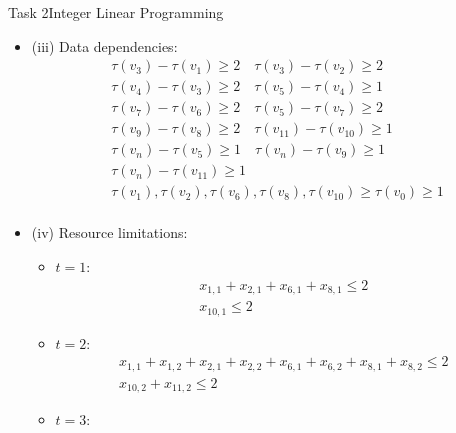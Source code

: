 \begin{frame}[allowframebreaks]{Task 2}{Integer Linear Programming}
\begin{solutionnoinc}
    \begin{itemize}
      \item \alert{(iii) Data dependencies:}
        \[
        \begin{aligned}
        & \tau\left(v_3\right)-\tau\left(v_1\right) \geq 2 \quad \tau\left(v_3\right)-\tau\left(v_2\right) \geq 2 \\
        & \tau\left(v_4\right)-\tau\left(v_3\right) \geq 2 \quad \tau\left(v_5\right)-\tau\left(v_4\right) \geq 1 \\
        & \tau\left(v_7\right)-\tau\left(v_6\right) \geq 2 \quad \tau\left(v_5\right)-\tau\left(v_7\right) \geq 2 \\
        & \tau\left(v_9\right)-\tau\left(v_8\right) \geq 2 \quad \tau\left(v_{11}\right)-\tau\left(v_{10}\right) \geq 1 \\
        & \tau\left(v_n\right)-\tau\left(v_5\right) \geq 1 \quad \tau\left(v_n\right)-\tau\left(v_9\right) \geq 1 \\
        & \tau\left(v_n\right)-\tau\left(v_{11}\right) \geq 1 \\
        & \tau\left(v_1\right), \tau\left(v_2\right), \tau\left(v_6\right), \tau\left(v_8\right), \tau\left(v_{10}\right) \geq \tau\left(v_0\right) \geq 1 \\
        &
        \end{aligned}
        \]
    \end{itemize}
  \end{solutionnoinc}
  \begin{solutionnoinc}
    \begin{itemize}
      \item \alert{(iv) Resource limitations:}
      \begin{itemize}
         \item $t=1$:
        \[ \begin{gathered}
          x_{1,1}+x_{2,1}+x_{6,1}+x_{8,1} \leq 2 \\
          x_{10,1} \leq 2
          \end{gathered}
        \]
      \item $t=2$:
        \[
          \begin{gathered}
          x_{1,1}+x_{1,2}+x_{2,1}+x_{2,2}+x_{6,1}+x_{6,2}+x_{8,1}+x_{8,2} \leq 2 \\
          x_{10,2}+x_{11,2} \leq 2
          \end{gathered}
        \]
      \item $t=3$:
        \[
          \begin{gathered}

\end{gathered}\]
\end{itemize}
\end{itemize}
\end{solutionnoinc}
\end{frame}

